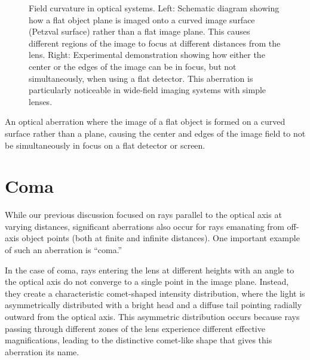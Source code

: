 \documentclass[
  a4paper,
]{book}
\begin{document}
\begin{figure}
\begin{minipage}{0.50\linewidth}

\end{minipage}%

\caption{\label{fig-field-curvature}Field curvature in optical systems.
Left: Schematic diagram showing how a flat object plane is imaged onto a
curved image surface (Petzval surface) rather than a flat image plane.
This causes different regions of the image to focus at different
distances from the lens. Right: Experimental demonstration showing how
either the center or the edges of the image can be in focus, but not
simultaneously, when using a flat detector. This aberration is
particularly noticeable in wide-field imaging systems with simple
lenses.}

\end{figure}%

\begin{tcolorbox}[enhanced jigsaw, coltitle=black, title=\textcolor{quarto-callout-note-color}{\faInfo}\hspace{0.5em}{Field Curvature}, colframe=quarto-callout-note-color-frame, toprule=.15mm, opacitybacktitle=0.6, left=2mm, opacityback=0, breakable, toptitle=1mm, bottomtitle=1mm, leftrule=.75mm, arc=.35mm, titlerule=0mm, colbacktitle=quarto-callout-note-color!10!white, rightrule=.15mm, bottomrule=.15mm, colback=white]

An optical aberration where the image of a flat object is formed on a
curved surface rather than a plane, causing the center and edges of the
image field to not be simultaneously in focus on a flat detector or
screen.

\end{tcolorbox}

\section{Coma}\label{coma}

While our previous discussion focused on rays parallel to the optical
axis at varying distances, significant aberrations also occur for rays
emanating from off-axis object points (both at finite and infinite
distances). One important example of such an aberration is ``coma.''

In the case of coma, rays entering the lens at different heights with an
angle to the optical axis do not converge to a single point in the image
plane. Instead, they create a characteristic comet-shaped intensity
distribution, where the light is asymmetrically distributed with a
bright head and a diffuse tail pointing radially outward from the
optical axis. This asymmetric distribution occurs because rays passing
through different zones of the lens experience different effective
magnifications, leading to the distinctive comet-like shape that gives
this aberration its name.
\end{document}
